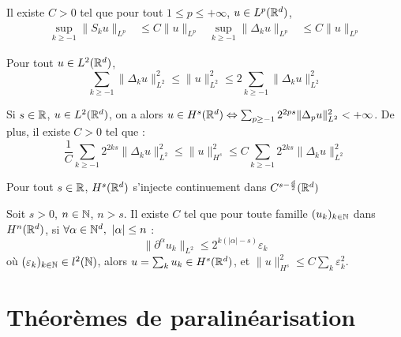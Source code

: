 \documentclass[11pt,a4paper]{article}
\begin{document}
\begin{lemma}\label{young}
Il existe $C>0$ tel que pour tout $1\leq p \leq +\infty$, $u \in L^p(\mathbb R^d)$, 
\begin{align*}
\sup_{k\geq -1}\|S_ku\|_{L^p} &\leq C \|u\|_{L^p} & \sup_{k\geq -1}\|\Delta_ku\|_{L^p} &\leq C \|u\|_{L^p}
\end{align*}
\end{lemma}


\begin{lemma}
Pour tout $u\in L^2(\mathbb R^d)$, 
\begin{equation}\label{qortho}
\sum_{k \geq -1} \|\Delta_k u \|^2_{L^2} \leq \| u \|^2_{L^2} \leq 2 \sum_{k \geq -1} \|\Delta_k u \|^2_{L^2} 
\end{equation}
\end{lemma}


\begin{prop}
Si $s\in \mathbb R$, $u\in L^2(\mathbb R^d)$, on a alors $u\in H^s(\mathbb R^d) \Leftrightarrow \sum_{p\geq -1}2^{2ps}\|\Delta_p u \|_{L^2}^2 < +\infty$. De plus, il existe $C>0$ tel que :
\begin{equation}\label{carac_sobol}
\frac{1}{C}\sum_{k\geq -1}2^{2ks}\|\Delta_k u \|_{L^2}^2 \leq \|u\|_{H^s}^2 \leq C \sum_{k\geq -1}2^{2ks}\|\Delta_k u \|_{L^2}^2 
\end{equation}
\end{prop}

\begin{prop}\label{inject}
Pour tout $s\in \mathbb R$, $H^s(\mathbb R^d)$ s'injecte continuement dans $C^{s-\frac{d}{2}}(\mathbb R^d)$
\end{prop}


\begin{prop}[]\label{meyer}
Soit $s>0$, $n\in \mathbb N$, $n>s$. Il existe $C$ tel que pour toute famille $(u_k)_{k\in \mathbb N}$ dans $H^n(\mathbb R^d)$, si $ \forall \alpha \in \mathbb N^d, \ |\alpha| \leq n $ :
\begin{equation*}
\|\partial ^\alpha u_k \|_{L^2} \leq 2^{k(|\alpha|-s)}\varepsilon_k
\end{equation*}
où $(\varepsilon_k)_{k\in \mathbb N} \in l^2(\mathbb N)$, alors $u=\sum_k u_k \in H^s(\mathbb R^d) $, et $ \|u\|_{H^s}^2 \leq C \sum_k \varepsilon_k^2 $.
\end{prop}


\section{Théorèmes de paralinéarisation}
\end{document}
